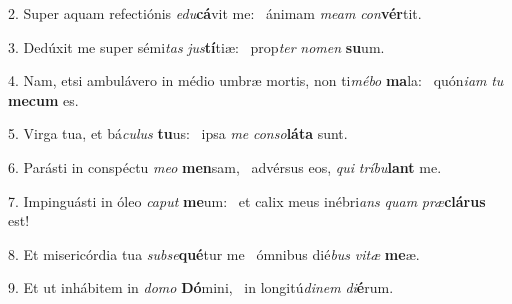 2. Super aquam refectiónis \textit{e}\textit{du}\textbf{cá}vit me: \ast\  ánimam \textit{me}\textit{am} \textit{con}\textbf{vér}tit.\

3. Dedúxit me super sémi\textit{tas} \textit{jus}\textbf{tí}tiæ: \ast\  prop\textit{ter} \textit{no}\textit{men} \textbf{su}um.\

4. Nam, etsi ambulávero in médio umbræ mortis, non ti\textit{mé}\textit{bo} \textbf{ma}la: \ast\  quón\textit{i}\textit{am} \textit{tu} \textbf{me}\textbf{cum} es.\

5. Virga tua, et bá\textit{cu}\textit{lus} \textbf{tu}us: \ast\  ipsa \textit{me} \textit{con}\textit{so}\textbf{lá}\textbf{ta} sunt.\

6. Parásti in conspéctu \textit{me}\textit{o} \textbf{men}sam, \ast\  advérsus eos, \textit{qui} \textit{trí}\textit{bu}\textbf{lant} me.\

7. Impinguásti in óleo \textit{ca}\textit{put} \textbf{me}um: \ast\  et calix meus inébri\textit{ans} \textit{quam} \textit{præ}\textbf{clá}\textbf{rus} est!\

8. Et misericórdia tua \textit{sub}\textit{se}\textbf{qué}tur me \ast\  ómnibus dié\textit{bus} \textit{vi}\textit{tæ} \textbf{me}æ.\

9. Et ut inhábitem in \textit{do}\textit{mo} \textbf{Dó}mini, \ast\  in longitú\textit{di}\textit{nem} \textit{di}\textbf{é}rum.\


